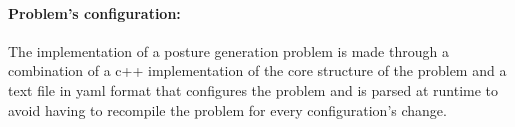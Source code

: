 \paragraph{Problem's configuration:}
The implementation of a posture generation problem is made through a combination of a c++ implementation of the core structure of the problem and a text file in yaml format that configures the problem and is parsed at runtime to avoid having to recompile the problem for every configuration's change.

